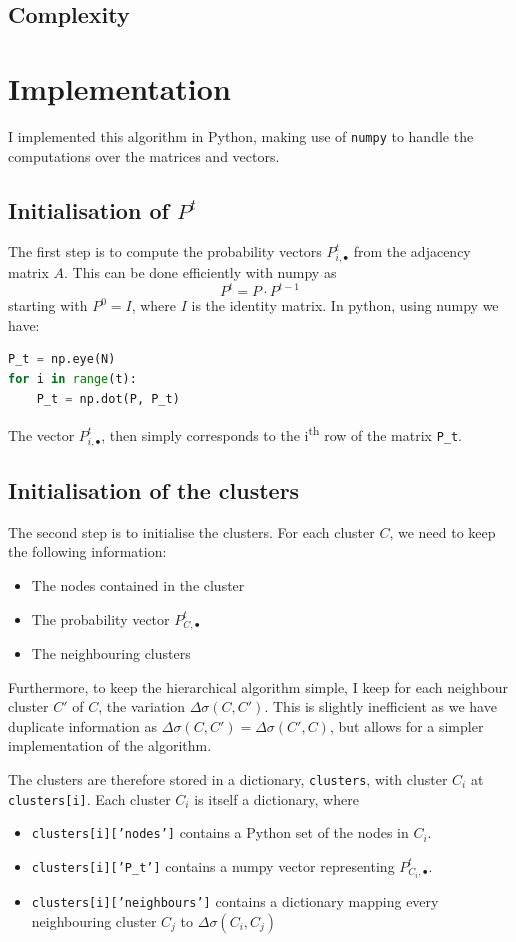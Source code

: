 \documentclass[12pt]{article}
\theoremstyle{definition}
\begin{document}
\subsection{Complexity}

\section{Implementation}
I implemented this algorithm in Python, making use of \texttt{numpy} to handle the computations over the matrices and vectors.

\subsection{Initialisation of $P^t$}
The first step is to compute the probability vectors $P_{i,\bullet}^t$ from the adjacency matrix $A$. This can be done efficiently with numpy as 
\[ P^t = P \cdot P^{t-1} \]
starting with $P^0=I$, where $I$ is the identity matrix. In python, using numpy we have:
\begin{lstlisting}[language=Python]
P_t = np.eye(N)
for i in range(t):
    P_t = np.dot(P, P_t)
\end{lstlisting}
The vector $P_{i,\bullet}^t$, then simply corresponds to the i\textsuperscript{th} row of the matrix \texttt{P\_t}.

\subsection{Initialisation of the clusters}
The second step is to initialise the clusters. For each cluster $C$, we need to keep the following information:
\begin{itemize}
	\item The nodes contained in the cluster
	\item The probability vector $P_{C,\bullet}^t$
	\item The neighbouring clusters
\end{itemize}
Furthermore, to keep the hierarchical algorithm simple, I keep for each neighbour cluster $C'$ of $C$, the variation $\Delta\sigma(C,C')$. This is slightly inefficient as we have duplicate information as $\Delta\sigma(C,C') = \Delta\sigma(C',C)$, but allows for a simpler implementation of the algorithm.

\bigskip

The clusters are therefore stored in a dictionary, \texttt{clusters}, with cluster $C_i$ at \texttt{clusters[i]}. Each cluster $C_i$ is itself a dictionary, where
\begin{itemize}
	\item \texttt{clusters[i]['nodes']} contains a Python set of the nodes in $C_i$.
	\item \texttt{clusters[i]['P\_t']} contains a numpy vector representing $P_{C_i,\bullet}^t$.
	\item \texttt{clusters[i]['neighbours']} contains a dictionary mapping every neighbouring cluster $C_j$ to $\Delta\sigma(C_i,C_j)$
\end{itemize}
\end{document}

